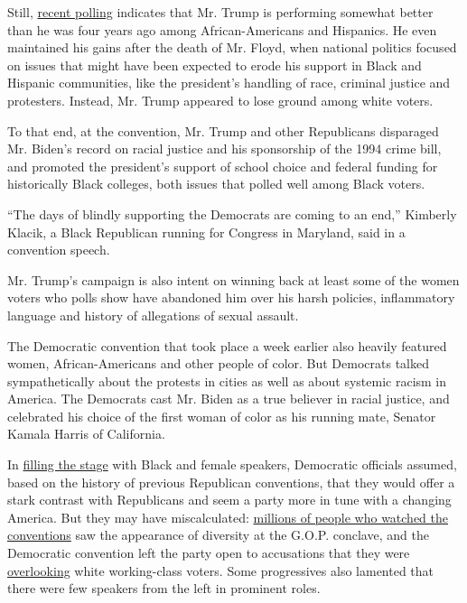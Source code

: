Still,
\href{https://www.cnn.com/2020/07/21/politics/joe-biden-black-voters/index.html}{recent
polling} indicates that Mr. Trump is performing somewhat better than he
was four years ago among African-Americans and Hispanics. He even
maintained his gains after the death of Mr. Floyd, when national
politics focused on issues that might have been expected to erode his
support in Black and Hispanic communities, like the president's handling
of race, criminal justice and protesters. Instead, Mr. Trump appeared to
lose ground among white voters.

To that end, at the convention, Mr. Trump and other Republicans
disparaged Mr. Biden's record on racial justice and his sponsorship of
the 1994 crime bill, and promoted the president's support of school
choice and federal funding for historically Black colleges, both issues
that polled well among Black voters.

``The days of blindly supporting the Democrats are coming to an end,''
Kimberly Klacik, a Black Republican running for Congress in Maryland,
said in a convention speech.

Mr. Trump's campaign is also intent on winning back at least some of the
women voters who polls show have abandoned him over his harsh policies,
inflammatory language and history of allegations of sexual assault.

The Democratic convention that took place a week earlier also heavily
featured women, African-Americans and other people of color. But
Democrats talked sympathetically about the protests in cities as well as
about systemic racism in America. The Democrats cast Mr. Biden as a true
believer in racial justice, and celebrated his choice of the first woman
of color as his running mate, Senator Kamala Harris of California.

In
\href{https://www.nytimes3xbfgragh.onion/interactive/2020/08/21/us/politics/dnc-speakers-run-time.html}{filling
the stage} with Black and female speakers, Democratic officials assumed,
based on the history of previous Republican conventions, that they would
offer a stark contrast with Republicans and seem a party more in tune
with a changing America. But they may have miscalculated:
\href{https://www.nytimes3xbfgragh.onion/2020/08/28/business/media/trump-biden-convention-ratings.html}{millions
of people who watched the conventions} saw the appearance of diversity
at the G.O.P. conclave, and the Democratic convention left the party
open to accusations that they were
\href{https://www.washingtonpost.com/opinions/2020/08/21/convention-shows-democrats-have-ceded-working-class-gop/}{overlooking}
white working-class voters. Some progressives also lamented that there
were few speakers from the left in prominent roles.

